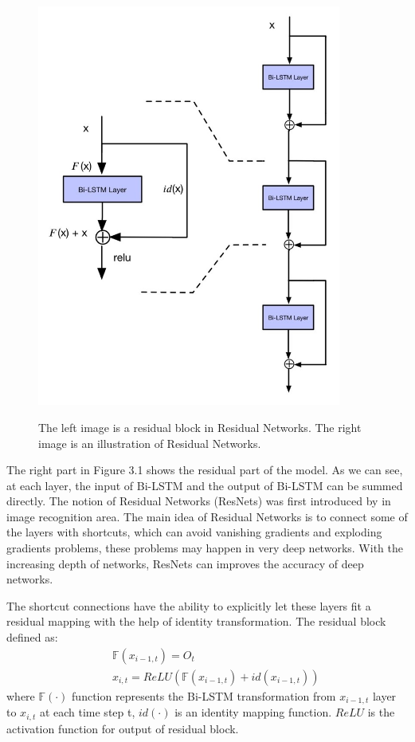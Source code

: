 \documentclass[senior]{IPSstyle}
\begin{document}
\begin{figure}[t]
  \centering
  \includegraphics[width=10cm]{resnets.jpg}\\
  \caption{The left image is a residual block in Residual Networks. The right image is an illustration of Residual Networks.}\label{NBde}
\end{figure}

The right part in Figure 3.1 shows the residual part of the model. As we can see, at each layer, the input of Bi-LSTM and the output of Bi-LSTM can be summed directly. The notion of Residual Networks (ResNets) was first introduced by \cite{he2015deep} in image recognition area. The main idea of Residual Networks is to connect some of the layers with shortcuts, which can avoid vanishing gradients and exploding gradients problems, these problems may happen in very deep networks. With the increasing depth of networks, ResNets can improves the accuracy of deep networks.

The shortcut connections have the ability to explicitly let these layers fit a residual mapping with the help of identity transformation. The residual block defined as:
\begin{eqnarray}
&&\mathbb{F}(x_{i-1,t}) = O_t \\
&&x_{i,t} = ReLU(\mathbb{F}(x_{i-1,t}) + id(x_{i-1,t}))
\end{eqnarray}
where $\mathbb{F}(\cdot)$ function represents the Bi-LSTM transformation from $x_{i-1,t}$ layer to $x_{i,t}$ at each time step t, $id(\cdot)$ is an identity mapping function. $ReLU$ is the activation function for output of residual block. 
\end{document}
